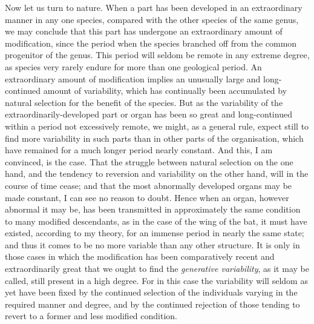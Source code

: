\indent Now let us turn to nature. When a part has been developed in an extraordinary manner in any one species, compared with the other species of the same genus, we may conclude that this part has undergone an extraordinary amount of modification, since the period when the species branched off from the common progenitor of the genus. This period will seldom be remote in any extreme degree, as species very rarely endure for more than one geological period. An extraordinary amount of modification implies an unusually large and long-continued amount of variability, which has continually been accumulated by natural selection for the benefit of the species. But as the variability of the extraordinarily-developed part or organ has been so great and long-continued within a period not excessively remote, we might, as a general rule, expect still to find more variability in such parts than in other parts of the organisation, which have remained for a much longer period nearly constant. And this, I am convinced, is the case. That the struggle between natural selection on the one hand, and the tendency to reversion and variability on the other hand, will in the course of time cease; and that the most abnormally developed organs may be made constant, I can see no reason to doubt. Hence when an organ, however abnormal it may be, has been transmitted in approximately the same condition to many modified descendants, as in the case of the wing of the bat, it must have existed, according to my theory, for an immense period in nearly the same state; and thus it comes to be no more variable than any other structure. It is only in those cases in which the modification has been comparatively recent and extraordinarily great that we ought to find the \emph{generative variability}, as it may be called, still present in a high degree. For in this case the variability will seldom as yet have been fixed by the continued selection of the individuals varying in the required manner and degree, and by the continued rejection of those tending to revert to a former and less modified condition.\\
